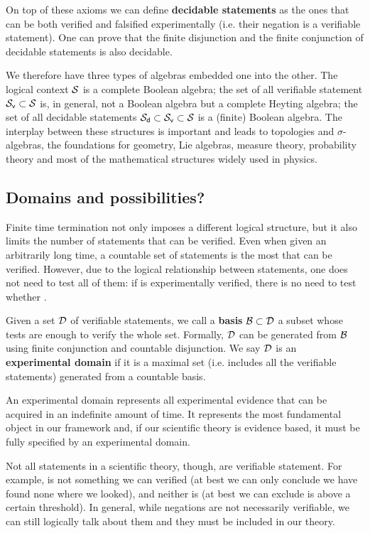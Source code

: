 \documentclass[letterpaper]{article}
\begin{document}
On top of these axioms we can define \textbf{decidable statements} as the ones that can be both verified and falsified experimentally (i.e. their negation is a verifiable statement). One can prove that the finite disjunction and the finite conjunction of decidable statements is also decidable.

We therefore have three types of algebras embedded one into the other. The logical context $\mathcal{S}$ is a complete Boolean algebra; the set of all verifiable statement $\mathcal{S}_\textsf{v} \subset \mathcal{S}$ is, in general, not a Boolean algebra but a complete Heyting algebra; the set of all decidable statements $\mathcal{S}_\textsf{d} \subset \mathcal{S}_\textsf{v} \subset \mathcal{S}$ is a (finite) Boolean algebra. The interplay between these structures is important and leads to topologies and $\sigma$-algebras, the foundations for geometry, Lie algebras, measure theory, probability theory and most of the mathematical structures widely used in physics.

\subsection{Domains and possibilities?}

Finite time termination not only imposes a different logical structure, but it also limits the number of statements that can be verified. Even when given an arbitrarily long time, a countable set of statements is the most that can be verified. However, due to the logical relationship between statements, one does not need to test all of them: if  is experimentally verified, there is no need to test whether .

Given a set $\mathcal{D}$ of verifiable statements, we call a \textbf{basis} $\mathcal{B} \subset \mathcal{D}$ a subset whose tests are enough to verify the whole set. Formally, $\mathcal{D}$ can be generated from $\mathcal{B}$ using finite conjunction and countable disjunction. We say $\mathcal{D}$ is an \textbf{experimental domain} if it is a maximal set (i.e. includes all the verifiable statements) generated from a countable basis.

An experimental domain represents all experimental evidence that can be acquired in an indefinite amount of time. It represents the most fundamental object in our framework and, if our scientific theory is evidence based, it must be fully specified by an experimental domain.

Not all statements in a scientific theory, though, are verifiable statement. For example,  is not something we can verified (at best we can only conclude we have found none where we looked), and neither is  (at best we can exclude is above a certain threshold). In general, while negations are not necessarily verifiable, we can still logically talk about them and they must be included in our theory.
\end{document}
